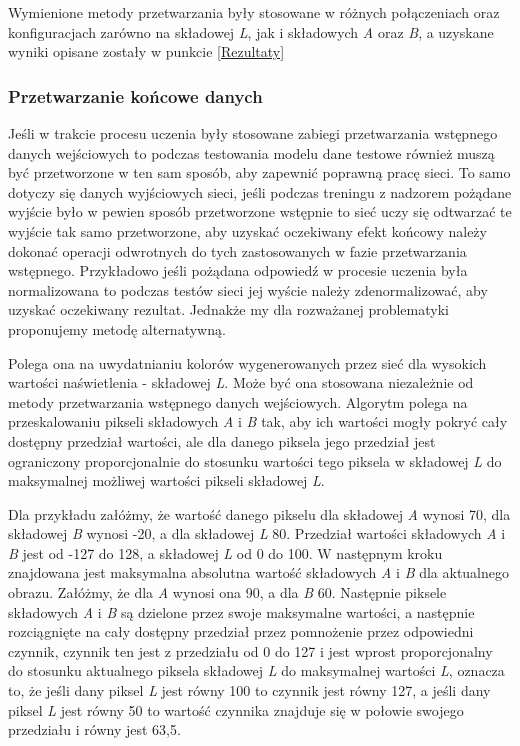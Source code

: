   Wymienione metody przetwarzania były stosowane w różnych połączeniach oraz
  konfiguracjach zarówno na składowej \textit{L}, jak i składowych \textit{A}
  oraz \textit{B}, a uzyskane wyniki opisane zostały w punkcie \ref{Rezultaty}

\subsubsection{Przetwarzanie końcowe danych}  \label{Przetwarzanie końcowe danych}

  Jeśli w trakcie procesu uczenia były stosowane zabiegi przetwarzania
  wstępnego danych wejściowych to podczas testowania modelu dane testowe również
  muszą być przetworzone w ten sam sposób, aby zapewnić poprawną pracę sieci.
  To samo dotyczy się danych wyjściowych sieci, jeśli podczas treningu z nadzorem
  pożądane wyjście było w pewien sposób przetworzone wstępnie to sieć uczy się
  odtwarzać te wyjście tak samo przetworzone, aby uzyskać oczekiwany efekt
  końcowy należy dokonać operacji odwrotnych do tych zastosowanych w fazie
  przetwarzania wstępnego. Przykładowo jeśli pożądana odpowiedź w procesie
  uczenia była normalizowana to podczas testów sieci jej wyście należy
  zdenormalizować, aby uzyskać oczekiwany rezultat. Jednakże my dla rozważanej
  problematyki proponujemy metodę alternatywną.

  Polega ona na uwydatnianiu kolorów wygenerowanych przez sieć dla wysokich
  wartości naświetlenia - składowej \textit{L}. Może być ona stosowana
  niezależnie od metody przetwarzania wstępnego danych wejściowych. Algorytm
  polega na przeskalowaniu pikseli składowych \textit{A} i \textit{B} tak, aby
  ich wartości mogły pokryć cały dostępny przedział wartości, ale dla danego
  piksela jego przedział jest ograniczony proporcjonalnie do stosunku wartości
  tego piksela w składowej \textit{L} do maksymalnej możliwej wartości pikseli
  składowej \textit{L}.

  Dla przykładu załóżmy, że wartość danego pikselu dla składowej \textit{A}
  wynosi 70, dla składowej \textit{B} wynosi -20, a dla składowej \textit{L} 80.
  Przedział wartości składowych \textit{A} i \textit{B} jest od -127 do 128, a
  składowej \textit{L} od 0 do 100. W następnym kroku znajdowana jest maksymalna
  absolutna wartość składowych \textit{A} i \textit{B} dla aktualnego obrazu.
  Załóżmy, że dla \textit{A} wynosi ona 90, a dla \textit{B} 60.
  Następnie piksele składowych \textit{A} i \textit{B} są dzielone przez
  swoje maksymalne wartości, a następnie rozciągnięte na cały dostępny przedział
  przez pomnożenie przez odpowiedni czynnik, czynnik ten jest z przedziału
  od 0 do 127 i jest wprost proporcjonalny do stosunku aktualnego piksela
  składowej \textit{L} do maksymalnej wartości \textit{L}, oznacza to, że jeśli
  dany piksel \textit{L} jest równy 100 to czynnik jest równy 127, a jeśli
  dany piksel \textit{L} jest równy 50 to wartość czynnika znajduje się w
  połowie swojego przedziału i równy jest 63,5.

